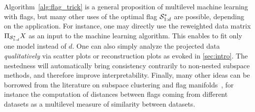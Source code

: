 Algorithm~\ref{alg:flag_trick} is a general proposition of multilevel machine learning with flags, but many other uses of the optimal flag $\S_{1:d}^*$ are possible, depending on the application. For instance, one may directly use the reweighted data matrix $\Pi_{\S_{1:d}^*} X$ as an input to the machine learning algorithm. This enables to fit only one model instead of $d$.
One can also simply analyze the projected data \textit{qualitatively} via scatter plots or reconstruction plots as evoked in \autoref{sec:intro}. The nestedness will automatically bring consistency contrarily to non-nested subspace methods, and therefore improve interpretability.
Finally, many other ideas can be borrowed from the literature on subspace clustering and flag manifolds~\citep{draper_flag_2014,launay_mechanical_2021, ma_flag_2021, mankovich_flag_2022,mankovich_chordal_2023,mankovich_fun_2024}, for instance the computation of distances between flags coming from different datasets as a multilevel measure of similarity between datasets.